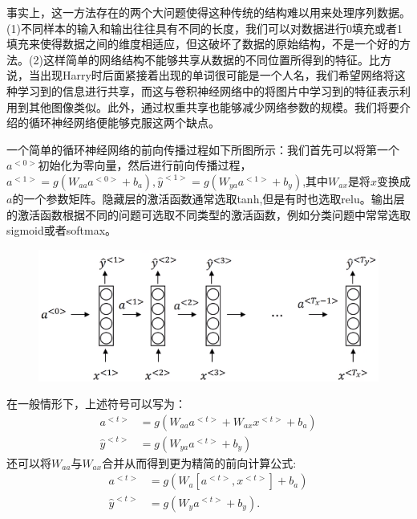 \documentclass{ctexart}
\begin{document}
事实上，这一方法存在的两个大问题使得这种传统的结构难以用来处理序列数据。
(1)不同样本的输入和输出往往具有不同的长度，我们可以对数据进行0填充或者1填充来使得数据之间的维度相适应，但这破坏了数据的原始结构，不是一个好的方法。(2)这样简单的网络结构不能够共享从数据的不同位置所得到的特征。比方说，当出现Harry时后面紧接着出现的单词很可能是一个人名，我们希望网络将这种学习到的信息进行共享，而这与卷积神经网络中的将图片中学习到的特征表示利用到其他图像类似。此外，通过权重共享也能够减少网络参数的规模。我们将要介绍的循环神经网络便能够克服这两个缺点。


一个简单的循环神经网络的前向传播过程如下所图所示：我们首先可以将第一个$a^{<0>}$初始化为零向量，然后进行前向传播过程，$a^{<1>}=g(W_{aa}a^{<0>}+b_a),\hat{y}^{<1>}=g(W_{ya}a^{<1>}+b_y)$,其中$W_{ax}$是将$x$变换成$a$的一个参数矩阵。隐藏层的激活函数通常选取tanh,但是有时也选取relu。输出层的激活函数根据不同的问题可选取不同类型的激活函数，例如分类问题中常常选取sigmoid或者softmax。

\begin{figure}[ht]
	\centering
	\includegraphics[scale=0.6]{2.png}
\end{figure}
在一般情形下，上述符号可以写为：
\begin{align*}
a^{<t>} &= g(W_{aa}a^{<t>}+W_{ax}x^{<t>}+b_a)\\
\hat{y}^{<t>}&=g(W_{ya}a^{<t>}+b_y)
\end{align*}
还可以将$W_{aa}$与$W_{ax}$合并从而得到更为精简的前向计算公式:
\begin{align*}
a^{<t>} &= g(W_{a}[a^{<t>},x^{<t>}]+b_a)\\
\hat{y}^{<t>}&=g(W_{y}a^{<t>}+b_y).
\end{align*}
\end{document}

